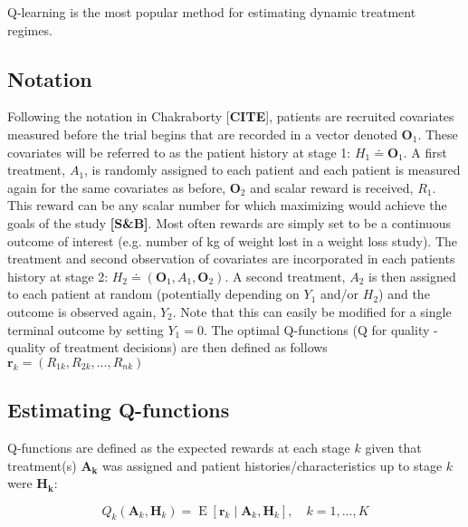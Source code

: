 \documentclass[12pt]{article}
\begin{document}
Q-learning is the most popular method for estimating dynamic treatment regimes.


\subsection{Notation} %
\label{sub:notation}
Following the notation in Chakraborty [\textbf{CITE}], patients are recruited covariates measured before the trial begins that are recorded in a vector denoted $\bm{\bm{O}}_{1}$. These covariates will be referred to as the patient history at stage 1: $H_{1} \doteq \bm{O}_{1}$. A first treatment, $A_{1}$, is randomly assigned to each patient and each patient is measured again for the same covariates as before, $\bm{O}_{2}$ and scalar reward is received, $R_{1}$. This reward can be any scalar number for which maximizing would achieve the goals of the study \textbf{[S\&B]}. Most often rewards are simply set to be a continuous outcome of interest (e.g. number of kg of weight lost in a weight loss study). The treatment and second observation of covariates are incorporated in each patients history at stage 2: $H_{2} \doteq (\bm{O}_{1}, A_{1}, \bm{O}_{2})$. A second treatment, $A_{2}$ is then assigned to each patient at random (potentially depending on $Y_{1}$ and/or $H_{2}$) and the outcome is observed again, $Y_{2}$. Note that this can easily be modified for a single terminal outcome by setting $Y_{1} = 0$. The optimal Q-functions (Q for quality - quality of treatment decisions) are then defined as follows $\bm{r}_{k} = (R_{1k}, R_{2k}, \ldots, R_{nk})$



\subsection{Estimating Q-functions} %
\label{sub:estimating_q_functions}

Q-functions are defined as the expected rewards at each stage $k$ given that treatment(s) $\bm{A_{k}}$ was assigned and patient histories/characteristics up to stage $k$ were $\bm{H_{k}}$:

\begin{equation}
   Q_{k}(\bm{A}_{k}, \bm{H}_{k})  = \operatorname{E}[\bm{r}_{k} \mid \bm{A}_{k}, \bm{H}_{k}], \quad k = 1, \ldots, K
\end{equation}
\end{document}
